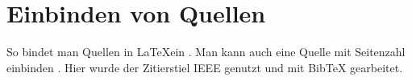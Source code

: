 \section{Einbinden von Quellen}\label{sec:quellen}
So bindet man Quellen in \LaTeX ein \cite{AllQuestionsSAP}.
Man kann auch eine Quelle mit Seitenzahl einbinden \cite[S. 420]{bianchiniPageRank2005}.
Hier wurde der Zitierstiel IEEE genutzt und mit BibTeX gearbeitet.